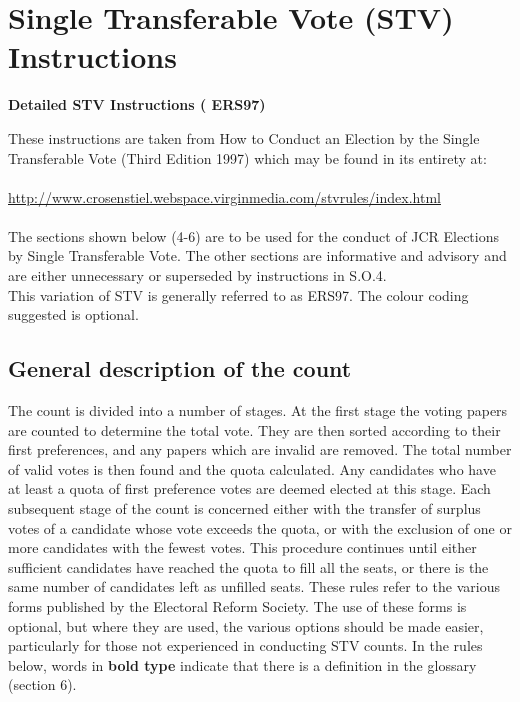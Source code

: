\chapter{Single Transferable Vote (STV) Instructions} \label{App:STV}

\textbf{Detailed STV Instructions ( ERS97)}

These instructions are taken from How to Conduct an Election by the Single Transferable Vote (Third Edition 1997) which may be found in its entirety at: \\ \\ \href{http://www.crosenstiel.webspace.virginmedia.com/stvrules/index.html}{http://www.crosenstiel.webspace.virginmedia.com/stvrules/index.html} \\ \\
The sections shown below (4-6) are to be used for the conduct of JCR Elections by Single Transferable Vote.  The other sections are informative and advisory and are either unnecessary or superseded by instructions in S.O.4. \\
This variation of STV is generally referred to as ERS97. The colour coding suggested is optional. \\

\section{General description of the count}
\appnpara The count is divided into a number of stages. At the first stage the voting papers are counted to determine the total vote. They are then sorted according to their first preferences, and any papers which are invalid are removed. The total number of valid votes is then found and the quota calculated. Any candidates who have at least a quota of first preference votes are deemed elected at this stage.
\appnpara Each subsequent stage of the count is concerned either with the transfer of surplus votes of a candidate whose vote exceeds the quota, or with the exclusion of one or more candidates with the fewest votes.
\appnpara This procedure continues until either sufficient candidates have reached the quota to fill all the seats, or there is the same number of candidates left as unfilled seats.
\appnpara These rules refer to the various forms published by the Electoral Reform Society. The use of these forms is optional, but where they are used, the various options should be made easier, particularly for those not experienced in conducting STV counts.
\appnpara In the rules below, words in \textbf{bold type} indicate that there is a definition in the glossary (section 6).

